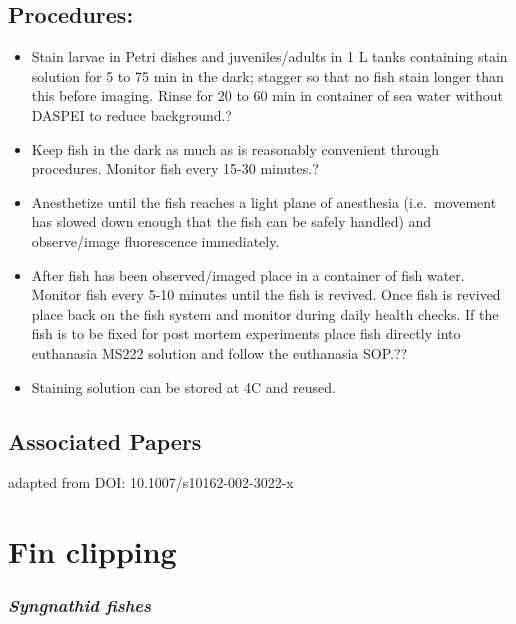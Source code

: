 \documentclass[
  letterpaper,
  DIV=11,
  numbers=noendperiod]{scrreprt}
\providecommand{\tightlist}{%
  \setlength{\itemsep}{0pt}\setlength{\parskip}{0pt}}\usepackage{longtable,booktabs,array}
\begin{document}
\hypertarget{procedures-3}{%
\section{Procedures:}\label{procedures-3}}

\begin{itemize}
\tightlist
\item
  Stain larvae in Petri dishes and juveniles/adults in 1 L tanks
  containing stain solution for 5 to 75 min in the dark; stagger so that
  no fish stain longer than this before imaging. Rinse for 20 to 60 min
  in container of sea water without DASPEI to reduce background.?
\item
  Keep fish in the dark as much as is reasonably convenient through
  procedures. Monitor fish every 15-30 minutes.?
\item
  Anesthetize until the fish reaches a light plane of anesthesia
  (i.e.~movement has slowed down enough that the fish can be safely
  handled) and observe/image fluorescence immediately.
\item
  After fish has been observed/imaged place in a container of fish
  water. Monitor fish every 5-10 minutes until the fish is revived. Once
  fish is revived place back on the fish system and monitor during daily
  health checks. If the fish is to be fixed for post mortem experiments
  place fish directly into euthanasia MS222 solution and follow the
  euthanasia SOP.??
\item
  Staining solution can be stored at 4C and reused.
\end{itemize}

\hypertarget{associated-papers-25}{%
\section{Associated Papers}\label{associated-papers-25}}

adapted from DOI: 10.1007/s10162-002-3022-x

\hypertarget{sec-vert-fin_clip_syn}{%
\chapter{Fin clipping}\label{sec-vert-fin_clip_syn}}

\hypertarget{syngnathid-fishes-3}{%
\subsection{\texorpdfstring{\emph{Syngnathid
fishes}}{Syngnathid fishes}}\label{syngnathid-fishes-3}}
\end{document}
